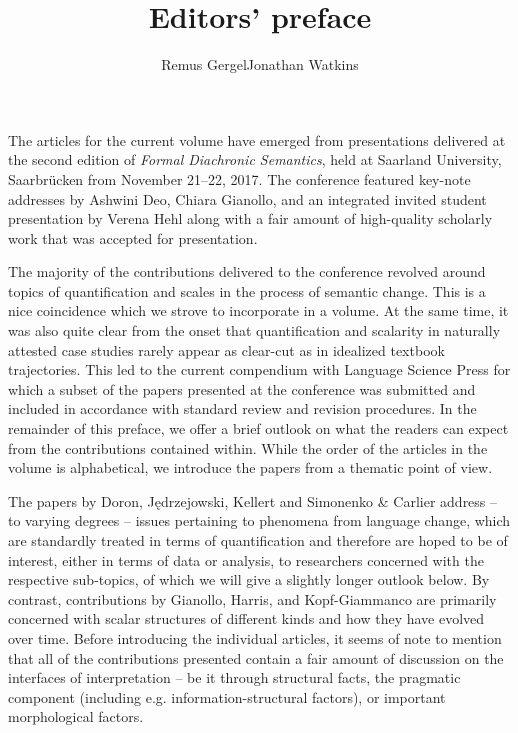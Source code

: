 \documentclass[output=paper]{langsci/langscibook}
\title{Editors' preface}
\author{Remus Gergel\affiliation{Universität des Saarlandes}\lastand Jonathan Watkins\affiliation{Universität des Saarlandes}}
\begin{document}
\maketitle

\noindent The articles for the current volume have emerged from presentations delivered at the second edition of \textit{Formal Diachronic Semantics}, held at Saarland University, Saarbrücken from November 21--22, 2017. The conference featured key-note addresses by Ashwini Deo, Chiara Gianollo, and an integrated invited student presentation by Verena Hehl along with a fair amount of high-quality scholarly work that was accepted for presentation.

The majority of the contributions delivered to the conference revolved around topics of quantification and scales in the process of semantic change. This is a nice coincidence which we strove to incorporate in a volume. At the same time, it was also quite clear from the onset that quantification and scalarity in naturally attested case studies rarely appear as clear-cut as in idealized textbook trajectories. This led to the current compendium with Language Science Press for which a subset of the papers presented at the conference was submitted and included in accordance with standard review and revision procedures. In the remainder of this preface, we offer a brief outlook on what the readers can expect from the contributions contained within. While the order of the articles in the volume is alphabetical, we introduce the papers from a thematic point of view.

The papers by Doron, Jędrzejowski, Kellert and Simonenko \& Carlier address – to varying degrees – issues pertaining to phenomena from language change, which are standardly treated in terms of quantification and therefore are hoped to be of interest, either in terms of data or analysis, to researchers concerned with the respective sub-topics, of which we will give a slightly longer outlook below. By contrast, contributions by Gianollo, Harris, and Kopf-Giammanco are primarily concerned with scalar structures of different kinds and how they have evolved over time. Before introducing the individual articles, it seems of note to mention that all of the contributions presented contain a fair amount of discussion on the interfaces of interpretation – be it through structural facts, the pragmatic component (including e.g. information-structural factors), or important morphological factors.\largerpage
\end{document}
